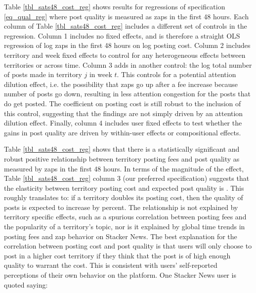 Table \ref{tbl_sats48_cost_reg} shows results for regressions of specification \eqref{eq_qual_reg} where post quality is measured as zaps in the first 48 hours. Each column of Table \ref{tbl_sats48_cost_reg} includes a different set of controls in the regression. Column 1 includes no fixed effects, and is therefore a straight OLS regression of log zaps in the first 48 hours on log posting cost. Column 2 includes territory and week fixed effects to control for any heterogeneous effects between territories or across time. 
Column 3 adds in another control: the log total number of posts made in territory $j$ in week $t$. This controls for a potential attention dilution effect, i.e. the possibility that zaps go up after a fee increase because number of posts go down, resulting in less attention congestion for the posts that do get posted. The coefficient on posting cost is still robust to the inclusion of this control, suggesting that the findings are not simply driven by an attention dilution effect.
Finally, column 4 includes user fixed effects to test whether the gains in post quality are driven by within-user effects or compositional effects. 

Table \ref{tbl_sats48_cost_reg} shows that there is a statistically significant and robust positive relationship between territory posting fees and post quality as measured by zaps in the first 48 hours. In terms of the magnitude of the effect, Table \ref{tbl_sats48_cost_reg} column 3 (our preferred specification) suggests that the elasticity between territory posting cost and expected post quality is . This roughly translates to: if a territory doubles its posting cost, then the quality of posts is expected to increase by  percent. The relationship is not explained by territory specific effects, such as a spurious correlation between posting fees and the popularity of a territory's topic, nor is it explained by global time trends in posting fees and zap behavior on Stacker News. 
The best explanation for the correlation between posting cost and post quality is that users will only choose to post in a higher cost territory if they think that the post is of high enough quality to warrant the cost. This is consistent with  users' self-reported perceptions of their own behavior on the platform. One Stacker News user is quoted saying: 


